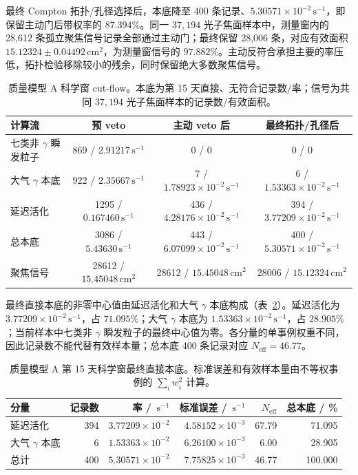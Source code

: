 \documentclass[11pt]{article}
\newcommand{\revblue}[1]{\textcolor{revisionblue}{#1}}
\newcommand{\cps}{\,\mathrm{s^{-1}}}
\begin{document}
最终 Compton 拓扑/孔径选择后，本底降至 400 条记录、$5.30571\times10^{-2}\cps$，即保留主动门后带权率的 $87.394\%$。同一 $37{,}194$ 光子焦面样本中，测量窗内的 28,612 条孤立聚焦信号记录全部通过主动门；最终保留 28,006 条，对应有效面积 $15.12324\pm0.04492\,\mathrm{cm^2}$，为测量窗信号的 $97.882\%$。主动反符合承担主要的率压低，拓扑检验移除较小的残余，同时保留绝大多数聚焦信号。

\begin{table}[H]
\centering
\caption{质量模型 A 科学窗 cut-flow。本底为第 15 天直接、无符合记录数/率；信号为共同 $37{,}194$ 光子焦面样本的记录数/有效面积。}
\label{tab:phase2_cutflow}
\footnotesize
\begin{tabular}{lccc}
\toprule
计算流 & 预 veto & 主动 veto 后 & 最终拓扑/孔径后 \\
\midrule
\revblue{七类非 $\gamma$ 瞬发粒子} & 869 / $2.91217\cps$ & 0 / 0 & 0 / 0 \\
\revblue{大气 $\gamma$ 本底} & 922 / $2.35667\cps$ & 7 / $1.78923\times10^{-2}\cps$ & 6 / $1.53363\times10^{-2}\cps$ \\
延迟活化 & 1295 / $0.167460\cps$ & 436 / $4.28176\times10^{-2}\cps$ & 394 / $3.77209\times10^{-2}\cps$ \\
总本底 & 3086 / $5.43630\cps$ & 443 / $6.07099\times10^{-2}\cps$ & 400 / $5.30571\times10^{-2}\cps$ \\
聚焦信号 & 28612 / $15.45048\,\mathrm{cm^2}$ & 28612 / $15.45048\,\mathrm{cm^2}$ & 28006 / $15.12324\,\mathrm{cm^2}$ \\
\bottomrule
\end{tabular}
\end{table}

最终直接本底的非零中心值由延迟活化和\revblue{大气 $\gamma$ 本底}构成（表~\ref{tab:reference_background_budget_zh}）。延迟活化为 $3.77209\times10^{-2}\cps$，占 $71.095\%$；\revblue{大气 $\gamma$ 本底}为 $1.53363\times10^{-2}\cps$，占 $28.905\%$；当前样本中\revblue{七类非 $\gamma$ 瞬发粒子}的最终中心值为零。各分量的单事例权重不同，因此记录数不能代替有效样本量；总本底 400 条记录对应 $N_{\mathrm{eff}}=46.77$。

\begin{table}[H]
\centering
\caption{质量模型 A 第 15 天科学窗最终直接本底。标准误差和有效样本量由不等权事例的 $\sum_i w_i^2$ 计算。}
\label{tab:reference_background_budget_zh}
\footnotesize
\begin{tabular}{lrrrrr}
\toprule
分量 & 记录数 & 率 / $\cps$ & 标准误差 / $\cps$ & $N_{\mathrm{eff}}$ & 总本底 / \% \\
\midrule
延迟活化 & 394 & $3.77209\times10^{-2}$ & $4.58152\times10^{-3}$ & 67.79 & 71.095 \\
\revblue{大气 $\gamma$ 本底} & 6 & $1.53363\times10^{-2}$ & $6.26100\times10^{-3}$ & 6.00 & 28.905 \\
\midrule
总计 & 400 & $5.30571\times10^{-2}$ & $7.75825\times10^{-3}$ & 46.77 & 100.000 \\
\bottomrule
\end{tabular}
\end{table}
\end{document}
